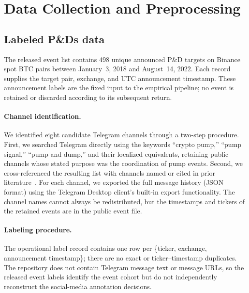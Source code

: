 \documentclass{ieeeaccess}
\begin{document}
\section{Data Collection and Preprocessing}

\subsection{Labeled P\&Ds data}
\label{section:pump_and_dump_data}

The released event \textcolor{revisionblue}{list} contains 498 unique announced P\&D targets on Binance spot BTC pairs between January~3, 2018 and August~14, 2022. Each record supplies the target pair, exchange, and UTC announcement timestamp. These announcement labels are the fixed input to the empirical pipeline; no event is retained or discarded according to its subsequent return.

\paragraph{Channel identification.}
We identified eight candidate Telegram channels through a two-step procedure. First, we searched Telegram directly using the keywords ``crypto pump,'' ``pump signal,'' ``pump and dump,'' and their localized equivalents, retaining public channels whose stated purpose was the coordination of pump events. Second, we cross-referenced the resulting list with channels named or cited in prior literature~\cite{la_morgia_pump_2020, pd_anatomy, econometrics11030022}. For each channel, we exported the full message history (JSON format) using the Telegram Desktop client's built-in export functionality. The channel names cannot always be redistributed, but the timestamps and tickers of the retained events are in the public event file.

\paragraph{Labeling procedure.}
The operational label record contains one row per \{ticker, exchange, announcement timestamp\}; there are no exact or ticker--timestamp duplicates. The repository does not contain Telegram message text or message URLs, so the \textcolor{revisionblue}{released event labels identify the event cohort} but \textcolor{revisionblue}{do} not \textcolor{revisionblue}{independently reconstruct} the social-media annotation decisions.
\end{document}
